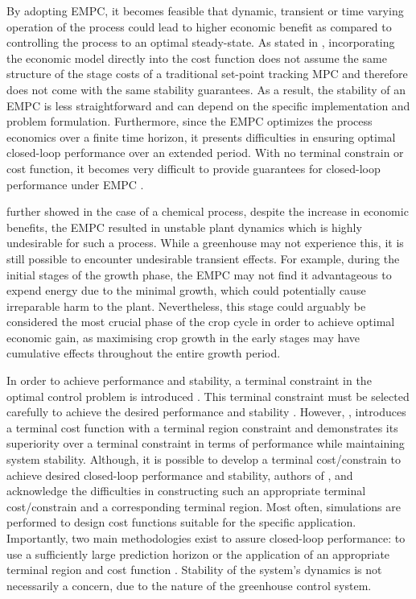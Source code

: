 By adopting EMPC, it becomes feasible that dynamic, transient or time varying operation of the process could lead to higher economic benefit as compared to controlling the process to an optimal steady-state. As stated in \cite{rawlingsFundamentalsEconomicModel2012}, incorporating the economic model directly into the cost function does not assume the same structure of the stage costs of a traditional set-point tracking MPC and therefore  does not come with the same stability guarantees. As a result, the stability of an EMPC is less straightforward and can depend on the specific implementation and problem formulation. Furthermore, since the EMPC optimizes the process economics over a finite time horizon, it presents difficulties in ensuring optimal closed-loop performance over an extended period. With no terminal constrain or cost function, it becomes very difficult to provide guarantees for closed-loop performance under EMPC \cite{ellisTutorialReviewEconomic2014}.

\cite{rawlingsFundamentalsEconomicModel2012} further showed in the case of a chemical process, despite the increase in economic benefits, the EMPC  resulted in unstable plant dynamics which is highly undesirable for such a process. While a greenhouse may not experience this, it is still possible to encounter undesirable transient effects. For example, during the initial stages of the growth phase, the EMPC may not find it advantageous to expend energy due to the minimal growth, which could potentially cause irreparable harm to the plant. Nevertheless, this stage could arguably be considered the most crucial phase of the crop cycle in order to achieve optimal economic gain, as maximising crop growth in the early stages may have cumulative effects throughout the entire growth period.

In order to achieve performance and stability, a terminal constraint in the optimal control problem is introduced \cite{amritEconomicOptimizationUsing2011}. This terminal constraint must be selected carefully to achieve the desired performance and stability \cite{rawlingsFundamentalsEconomicModel2012}. However, \cite{amritEconomicOptimizationUsing2011}, introduces a terminal cost function with a terminal region constraint and demonstrates its superiority over a terminal constraint in terms of performance while maintaining system stability. Although, it is possible to develop a terminal cost/constrain to achieve desired closed-loop performance and stability, authors of \cite{rawlingsFundamentalsEconomicModel2012}, \cite{amritEconomicOptimizationUsing2011} and \cite{ellisTutorialReviewEconomic2014} acknowledge the difficulties in constructing such an appropriate terminal cost/constrain and a corresponding terminal region. Most often, simulations are performed to design cost functions suitable for the specific application. Importantly, two main methodologies exist to assure closed-loop performance: to use a sufficiently large prediction horizon or the application of an appropriate terminal region and cost function \cite{ellisTutorialReviewEconomic2014}. Stability of the system's dynamics is not necessarily a concern, due to the nature of the greenhouse control system.

